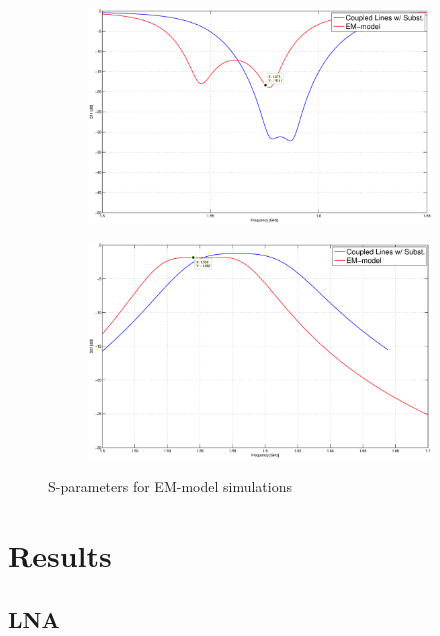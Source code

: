 \documentclass[a4paper]{article}        %
\begin{document}
			\begin{figure}[H]
			\centering
				\begin{subfigure}{0.8\textwidth}
				\includegraphics[width=\textwidth]{fig/Filter/2nd_order/plots/S11_layout.eps}
				\end{subfigure}
				\begin{subfigure}{0.8\textwidth}
				\includegraphics[width=\textwidth]{fig/Filter/2nd_order/plots/S21_layout.eps}
				\end{subfigure}
			\caption{S-parameters for EM-model simulations}
			\label{fig:filter_em_model}
			\end{figure} 
\section{Results}
	\subsection{LNA}
\end{document}

